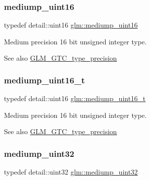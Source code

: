 \subsubsection{\texorpdfstring{mediump\+\_\+uint16}{mediump\_uint16}}
{\footnotesize\ttfamily typedef detail\+::uint16 \hyperlink{group__gtc__type__precision_ga2cef3a0d7b0fce75c9885f64656d8933}{glm\+::mediump\+\_\+uint16}}

Medium precision 16 bit unsigned integer type. \begin{DoxySeeAlso}{See also}
\hyperlink{group__gtc__type__precision}{G\+L\+M\+\_\+\+G\+T\+C\+\_\+type\+\_\+precision} 
\end{DoxySeeAlso}
\mbox{\label{group__gtc__type__precision_ga0b385466deac5ac96061ef2cdd6db20f}} 
\subsubsection{\texorpdfstring{mediump\+\_\+uint16\+\_\+t}{mediump\_uint16\_t}}
{\footnotesize\ttfamily typedef detail\+::uint16 \hyperlink{group__gtc__type__precision_ga0b385466deac5ac96061ef2cdd6db20f}{glm\+::mediump\+\_\+uint16\+\_\+t}}

Medium precision 16 bit unsigned integer type. \begin{DoxySeeAlso}{See also}
\hyperlink{group__gtc__type__precision}{G\+L\+M\+\_\+\+G\+T\+C\+\_\+type\+\_\+precision} 
\end{DoxySeeAlso}
\mbox{\label{group__gtc__type__precision_ga861dbd1051f488e425b3966001b568e5}} 
\subsubsection{\texorpdfstring{mediump\+\_\+uint32}{mediump\_uint32}}
{\footnotesize\ttfamily typedef detail\+::uint32 \hyperlink{group__gtc__type__precision_ga861dbd1051f488e425b3966001b568e5}{glm\+::mediump\+\_\+uint32}}

